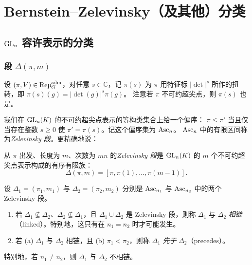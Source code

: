 \section{Bernstein--Zelevinsky（及其他）分类}

\subsection{$\mathrm{GL}_n$ 容许表示的分类}

\subsubsection{段 $\Delta(\pi,m)$}

设 $(\pi,V)\in\mathrm{Rep}^{\mathrm{adm}}_G$，对任意 $s\in\mathbb{C}$，记 $\pi(s)$ 为 $\pi$ 用特征标
$|\det|^{s}$ 所作的扭转，即 $\pi(s)(g)=|\det(g)|^{s}\pi(g)$。
注意若 $\pi$ 不可约超尖点，则 $\pi(s)$ 也是。

我们在 $\mathrm{GL}_n(K)$ 的不可约超尖点表示的等构类集合上给一个偏序：
$\pi\le\pi'$ 当且仅当存在整数 $s\ge 0$ 使 $\pi'=\pi(s)$。记这个偏序集为 $\mathrm{Asc}_n$。
$\mathrm{Asc}_n$ 中的有限区间称为\emph{Zelevinsky 段}。更精确地说：

\begin{definition}
从 $\pi$ 出发、长度为 $m$、次数为 $mn$ 的\emph{Zelevinsky 段}是
$\mathrm{GL}_n(K)$ 的 $m$ 个不可约超尖点表示构成的有序有限族：
\[
\Delta(\pi,m)=[\pi,\pi(1),\dots,\pi(m-1)].
\]
\end{definition}

\begin{definition}
设 $\Delta_1=(\pi_1,m_1)$ 与 $\Delta_2=(\pi_2,m_2)$ 分别是 $\mathrm{Asc}_{n_1}$ 与 $\mathrm{Asc}_{n_2}$
中的两个 Zelevinsky 段。
\begin{enumerate}[label=(\arabic*),leftmargin=2.2em]
\item 若 $\Delta_1\not\subseteq\Delta_2$、$\Delta_2\not\subseteq\Delta_1$，且
      $\Delta_1\cup\Delta_2$ 是 Zelevinsky 段，则称 $\Delta_1$ 与 $\Delta_2$ \emph{相链}
      （linked）。特别地，这只有在 $n_1=n_2$ 时才可能发生。
\item 若 (a) $\Delta_1$ 与 $\Delta_2$ 相链，且 (b) $\pi_1<\pi_2$，则称
      $\Delta_1$ \emph{先于} $\Delta_2$（precedes）。
\end{enumerate}
\end{definition}

\begin{remark}
特别地，若 $n_1\neq n_2$，则 $\Delta_1$ 与 $\Delta_2$ 不相链。
\end{remark}

